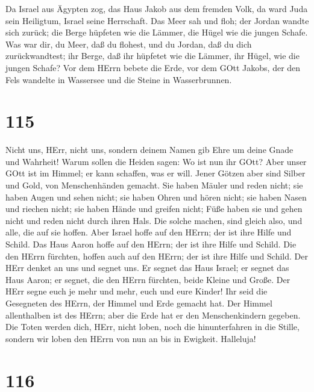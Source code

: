  Da Israel aus Ägypten zog, das Haus Jakob aus dem fremden
Volk,  da ward Juda sein Heiligtum, Israel seine Herrschaft.
 Das Meer sah und floh; der Jordan wandte sich zurück;
 die Berge hüpfeten wie die Lämmer, die Hügel wie die jungen
Schafe.  Was war dir, du Meer, daß du flohest, und du
Jordan, daß du dich zurückwandtest;  ihr Berge, daß ihr
hüpfetet wie die Lämmer, ihr Hügel, wie die jungen Schafe? 
Vor dem HErrn bebete die Erde, vor dem GOtt Jakobs,  der den
Fels wandelte in Wassersee und die Steine in Wasserbrunnen.

\hypertarget{section-114}{%
\section{115}\label{section-114}}

 Nicht uns, HErr, nicht uns, sondern deinem Namen gib Ehre
um deine Gnade und Wahrheit!  Warum sollen die Heiden sagen:
Wo ist nun ihr GOtt?  Aber unser GOtt ist im Himmel; er kann
schaffen, was er will.  Jener Götzen aber sind Silber und
Gold, von Menschenhänden gemacht.  Sie haben Mäuler und
reden nicht; sie haben Augen und sehen nicht;  sie haben
Ohren und hören nicht; sie haben Nasen und riechen nicht; 
sie haben Hände und greifen nicht; Füße haben sie und gehen nicht und
reden nicht durch ihren Hals.  Die solche machen, sind
gleich also, und alle, die auf sie hoffen.  Aber Israel
hoffe auf den HErrn; der ist ihre Hilfe und Schild.  Das
Haus Aaron hoffe auf den HErrn; der ist ihre Hilfe und Schild.
 Die den HErrn fürchten, hoffen auch auf den HErrn; der ist
ihre Hilfe und Schild.  Der HErr denket an uns und segnet
uns. Er segnet das Haus Israel; er segnet das Haus Aaron; 
er segnet, die den HErrn fürchten, beide Kleine und Große. 
Der HErr segne euch je mehr und mehr, euch und eure Kinder!
 Ihr seid die Gesegneten des HErrn, der Himmel und Erde
gemacht hat.  Der Himmel allenthalben ist des HErrn; aber
die Erde hat er den Menschenkindern gegeben.  Die Toten
werden dich, HErr, nicht loben, noch die hinunterfahren in die Stille,
 sondern wir loben den HErrn von nun an bis in Ewigkeit.
Halleluja!

\hypertarget{section-115}{%
\section{116}\label{section-115}}

